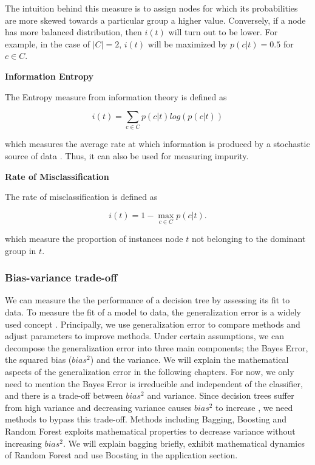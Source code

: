 The intuition behind this measure is to assign nodes for which its probabilities are more skewed towards a particular group a higher value.
Conversely, if a node has more balanced distribution, then \(i(t)\) will turn out to be lower.
For example, in the case of \( |C|=2 \), \(i(t)\) will be maximized by \( p(c|t) = 0.5 \) for \( c \in C \).


\textbf{Information Entropy}

The Entropy measure from information theory is defined as

\begin{equation}
    i(t) = \sum_{c \in C} p(c|t) log(p(c|t))
\end{equation}

which measures the average rate at which information is produced by a stochastic source of data .
Thus, it can also be used for measuring impurity.

\newpage

\textbf{Rate of Misclassification}

The rate of misclassification is defined as 

\begin{equation}
    i(t) = 1 - \max_{c \in C} p(c|t) .
\end{equation}

which measure the proportion of instances node \(t\) not belonging to the dominant group in \(t\).


\subsubsection{Bias-variance trade-off}
We can measure the the performance of a decision tree by assessing its fit to data. 
To measure the fit of a model to data, the generalization error is a widely used concept \cite{breiman2001random}.
Principally, we use generalization error to compare methods and adjust parameters to improve methods. 
Under certain assumptions, we can decompose the generalization error into three main components; the Bayes Error, 
the squared bias ($bias^2$) and the variance. 
We will explain the mathematical aspects of the generalization error in the following chapters. 
For now, we only need to mention the Bayes Error is irreducible and independent of the classifier, 
and there is a trade-off between $bias^2$ and variance. Since decision trees suffer from high variance and 
decreasing variance causes $bias^2$ to increase \cite{geman1992neural}, we need methods to bypass this trade-off. 
Methods including Bagging, Boosting and Random Forest exploits mathematical properties to decrease variance 
without increasing $bias^2$. We will explain bagging briefly, exhibit mathematical dynamics of Random Forest and 
use Boosting in the application section.


